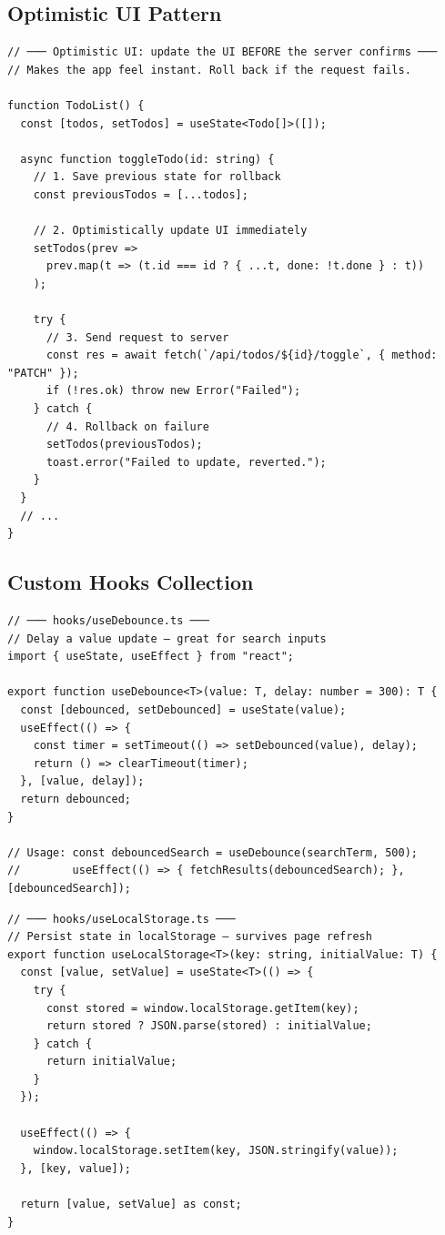 \documentclass[10pt, a4paper]{article}
\begin{document}
\subsection{Optimistic UI Pattern}


\begin{lstlisting}[language=myjs]
// ─── Optimistic UI: update the UI BEFORE the server confirms ───
// Makes the app feel instant. Roll back if the request fails.

function TodoList() {
  const [todos, setTodos] = useState<Todo[]>([]);

  async function toggleTodo(id: string) {
    // 1. Save previous state for rollback
    const previousTodos = [...todos];

    // 2. Optimistically update UI immediately
    setTodos(prev =>
      prev.map(t => (t.id === id ? { ...t, done: !t.done } : t))
    );

    try {
      // 3. Send request to server
      const res = await fetch(`/api/todos/${id}/toggle`, { method: "PATCH" });
      if (!res.ok) throw new Error("Failed");
    } catch {
      // 4. Rollback on failure
      setTodos(previousTodos);
      toast.error("Failed to update, reverted.");
    }
  }
  // ...
}
\end{lstlisting}


\subsection{Custom Hooks Collection}


\begin{lstlisting}[language=myjs]
// ─── hooks/useDebounce.ts ───
// Delay a value update — great for search inputs
import { useState, useEffect } from "react";

export function useDebounce<T>(value: T, delay: number = 300): T {
  const [debounced, setDebounced] = useState(value);
  useEffect(() => {
    const timer = setTimeout(() => setDebounced(value), delay);
    return () => clearTimeout(timer);
  }, [value, delay]);
  return debounced;
}

// Usage: const debouncedSearch = useDebounce(searchTerm, 500);
//        useEffect(() => { fetchResults(debouncedSearch); }, [debouncedSearch]);
\end{lstlisting}


\begin{lstlisting}[language=myjs]
// ─── hooks/useLocalStorage.ts ───
// Persist state in localStorage — survives page refresh
export function useLocalStorage<T>(key: string, initialValue: T) {
  const [value, setValue] = useState<T>(() => {
    try {
      const stored = window.localStorage.getItem(key);
      return stored ? JSON.parse(stored) : initialValue;
    } catch {
      return initialValue;
    }
  });

  useEffect(() => {
    window.localStorage.setItem(key, JSON.stringify(value));
  }, [key, value]);

  return [value, setValue] as const;
}
\end{lstlisting}
\end{document}
